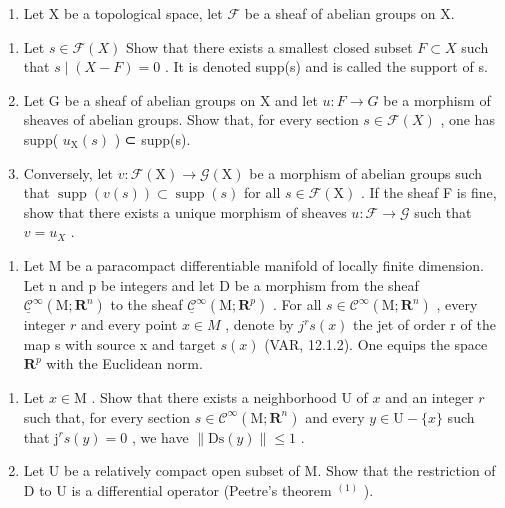 \begin{enumerate}
\def\labelenumi{\arabic{enumi})}
\setcounter{enumi}{1}
\tightlist
\item
  Let X be a topological space, let \(\mathcal{F}\) be a sheaf of abelian groups on X.
\end{enumerate}

\begin{enumerate}
\def\labelenumi{\alph{enumi})}
\item
  Let \(s \in \mathcal{F}(X)\) Show that there exists a smallest closed subset \(F \subset X\) such that \(s \mid (X - F) = 0\) . It is denoted supp(s) and is called the support of s.
\item
  Let G be a sheaf of abelian groups on X and let \(u: F \to G\) be a morphism of sheaves of abelian groups. Show that, for every section \(s \in \mathcal{F}(X)\) , one has supp( \(u_{\mathrm{X}}(s)\) ) ⊂ supp(s).
\item
  Conversely, let \(v\colon\mathcal{F}(\mathrm{X})\to\mathcal{G}(\mathrm{X})\) be a morphism of abelian groups such that \(\operatorname{supp}(v(s))\subset\operatorname{supp}(s)\) for all \(s\in\mathcal{F}(\mathrm{X})\) . If the sheaf F is fine, show that there exists a unique morphism of sheaves \(u\colon\mathcal{F}\to\mathcal{G}\) such that \(v=u_{X}\) .
\end{enumerate}

\begin{enumerate}
\def\labelenumi{\arabic{enumi})}
\setcounter{enumi}{2}
\tightlist
\item
  Let M be a paracompact differentiable manifold of locally finite dimension. Let n and p be integers and let D be a morphism from the sheaf \(\underline{\mathcal{C}}^{\infty}(\mathrm{M};\mathbf{R}^{n})\) to the sheaf \(\underline{\mathcal{C}}^{\infty}(\mathrm{M};\mathbf{R}^{p})\) . For all \(s \in \mathcal{C}^{\infty}(\mathrm{M};\mathbf{R}^{n})\) , every integer \(r\) and every point \(x \in M\) , denote by \(j^{r}s(x)\) the jet of order r of the map s with source x and target \(s(x)\) (VAR, 12.1.2). One equips the space \(\mathbf{R}^{p}\) with the Euclidean norm.
\end{enumerate}

\begin{enumerate}
\def\labelenumi{\alph{enumi})}
\item
  Let \(x \in \mathrm{M}\) . Show that there exists a neighborhood U of \(x\) and an integer \(r\) such that, for every section \(s \in \mathcal{C}^{\infty}(\mathrm{M}; \mathbf{R}^{n})\) and every \(y \in \mathrm{U} - \{x\}\) such that \(\mathrm{j}^{r}s(y) = 0\) , we have \(\| \mathrm{Ds}(y) \| \leqslant 1\) .
\item
  Let U be a relatively compact open subset of M. Show that the restriction of D to U is a differential operator (Peetre's theorem \(^{(1)}\) ).
\end{enumerate}

